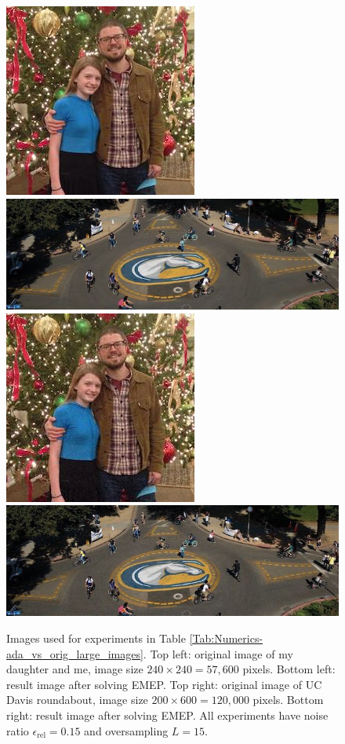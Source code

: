 \begin{figure}[H]
\centering
	\includegraphics[scale=0.46875]{jul_and_me_orig}
		\hspace{0.1cm}
		\includegraphics[scale=0.5625]{UCD_orig}
		\vspace{0.3cm} \hspace{0.02cm}
		\\
	\includegraphics[scale=0.46875]{jul_and_me_L_15_ada40}	
		\hspace{0.1cm}
		\includegraphics[scale=0.5625]{UCD_L_15_ada40} 
		\vspace{0.0cm}
	\caption{
Images used for experiments in Table \ref{Tab:Numerics-ada_vs_orig_large_images}.
Top left: original image of my daughter and me, image size $240 \times 240 = 57,600$ pixels.
Bottom left: result image after solving EMEP.
Top right: original image of UC Davis roundabout, image size $200 \times 600 = 120,000$ pixels.
Bottom right: result image after solving EMEP.
All experiments have noise ratio $\epsilon_\text{rel} = 0.15$ and oversampling $L = 15$.
	}
\label{Fig:Numerics-large_images}
\end{figure}
